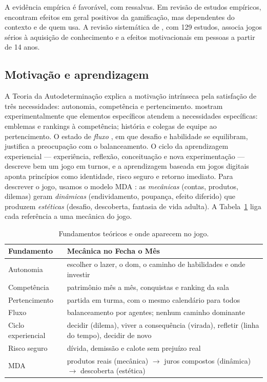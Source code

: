 \documentclass[11pt,a4paper]{article}
\begin{document}
A evidência empírica é favorável, com ressalvas. Em revisão de estudos empíricos, \citet{hamari2014} encontram efeitos em geral positivos da gamificação, mas dependentes do contexto e de quem usa. A revisão sistemática de \citet{connolly2012}, com 129 estudos, associa jogos sérios à aquisição de conhecimento e a efeitos motivacionais em pessoas a partir de 14 anos.

\subsection{Motivação e aprendizagem}

A Teoria da Autodeterminação \cite{ryan2000} explica a motivação intrínseca pela satisfação de três necessidades: autonomia, competência e pertencimento. \citet{sailer2017} mostram experimentalmente que elementos específicos atendem a necessidades específicas: emblemas e rankings à competência; história e colegas de equipe ao pertencimento. O estado de \emph{fluxo} \cite{csikszentmihalyi1990}, em que desafio e habilidade se equilibram, justifica a preocupação com o balanceamento. O ciclo da aprendizagem experiencial \cite{kolb1984} --- experiência, reflexão, conceituação e nova experimentação --- descreve bem um jogo em turnos, e a aprendizagem baseada em jogos digitais \cite{prensky2001,gee2003} aponta princípios como identidade, risco seguro e retorno imediato. Para descrever o jogo, usamos o modelo MDA \cite{hunicke2004}: as \emph{mecânicas} (contas, produtos, dilemas) geram \emph{dinâmicas} (endividamento, poupança, efeito diferido) que produzem \emph{estéticas} (desafio, descoberta, fantasia de vida adulta). A Tabela~\ref{tab:teoria} liga cada referência a uma mecânica do jogo.

\begin{table}[ht]
  \centering\small
  \caption{Fundamentos teóricos e onde aparecem no jogo.}
  \label{tab:teoria}
  \begin{tabularx}{\linewidth}{@{}l X@{}}
    \toprule
    Fundamento & Mecânica no Fecha o Mês \\
    \midrule
    Autonomia \cite{ryan2000} & escolher o lazer, o dom, o caminho de habilidades e onde investir \\
    Competência \cite{ryan2000,sailer2017} & patrimônio mês a mês, conquistas e ranking da sala \\
    Pertencimento \cite{ryan2000,sailer2017} & partida em turma, com o mesmo calendário para todos \\
    Fluxo \cite{csikszentmihalyi1990} & balanceamento por agentes; nenhum caminho dominante \\
    Ciclo experiencial \cite{kolb1984} & decidir (dilema), viver a consequência (virada), refletir (linha do tempo), decidir de novo \\
    Risco seguro \cite{gee2003} & dívida, demissão e calote sem prejuízo real \\
    MDA \cite{hunicke2004} & produtos reais (mecânica) $\rightarrow$ juros compostos (dinâmica) $\rightarrow$ descoberta (estética) \\
    \bottomrule
  \end{tabularx}
\end{table}
\end{document}
